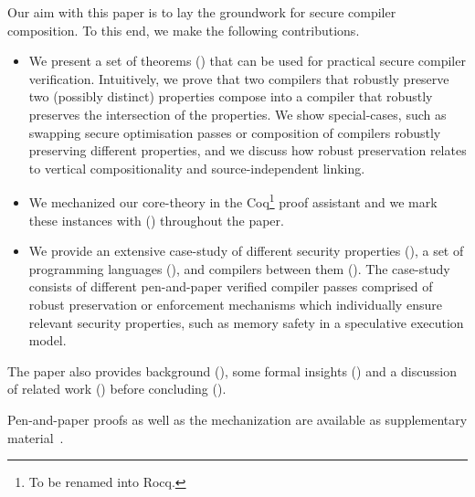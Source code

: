   Our aim with this paper is to lay the groundwork for secure compiler composition. 
  To this end, we make the following contributions.
  \begin{itemize}
    \item 
      We present a set of theorems () that can be used for practical secure compiler verification.
      Intuitively, we prove that two compilers that robustly preserve two (possibly distinct) properties compose into a compiler that robustly preserves the intersection of the properties.
      We show special-cases, such as swapping secure optimisation passes or composition of compilers robustly preserving different properties, and we discuss how robust preservation relates to vertical compositionality and source-independent linking.
    \item
      We mechanized our core-theory in the Coq\footnote{To be renamed into Rocq.} proof assistant and we mark these instances with (\CoqSymbol) throughout the paper.
    \item 
      We provide an extensive case-study of different security properties (), a set of programming languages (), and compilers between them ().
      The case-study consists of different pen-and-paper verified compiler passes comprised of robust preservation or enforcement mechanisms which individually ensure relevant security properties, such as memory safety in a speculative execution model.
  \end{itemize}
  The paper also provides background (), some formal insights () and a discussion of related work () before concluding ().

  Pen-and-paper proofs as well as the mechanization are available as supplementary material~\cite{}.

